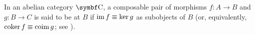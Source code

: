 \begin{definition}\label{def:exact_morphism_pair}
  In an abelian category \( \Cat{C} \), a composable pair of morphisms \( f: A \to B \) and \( g: B \to C \) is said to be  at \( B \) if \( \operatorname{im} f \equiv \ker g \) as subobjects of \( B \) (or, equivalently, \( \operatorname{co}\!\ker f \equiv \operatorname{co}\!\operatorname{im} g \); see ).
\end{definition}

